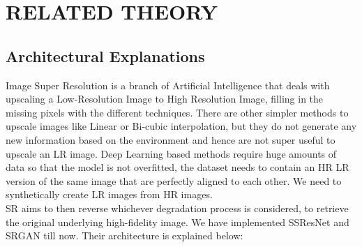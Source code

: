 \newpage
\section{RELATED THEORY}
\subsection{Architectural Explanations}
Image Super Resolution is a branch of Artificial Intelligence that deals with upscaling a Low-Resolution Image to High Resolution Image, filling in the missing pixels with the different techniques. There are other simpler methods to upscale images like Linear or Bi-cubic interpolation, but they do not generate any new information based on the environment and hence are not super useful to upscale an LR image. Deep Learning based methods require huge amounts of data so that the model is not overfitted, the dataset needs to contain an HR  LR version of the same image that are perfectly aligned to each other. We need to synthetically create LR images from HR images.\\
SR aims to then reverse whichever degradation process is considered, to retrieve the original underlying high-fidelity image. We have implemented SSResNet and SRGAN till now. Their architecture is explained below: 
